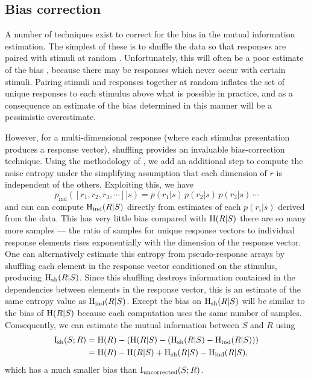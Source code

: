 \subsection{Bias correction}
\label{sec:info-bias}

A number of techniques exist to correct for the bias in the mutual information estimation.
The simplest of these is to shuffle the data so that responses are paired with stimuli at random \citep{Optican1991}.
Unfortunately, this will often be a poor estimate of the bias \citep{Panzeri1996}, because there may be responses which never occur with certain stimuli.
Pairing stimuli and responses together at random inflates the set of unique responses to each stimulus above what is possible in practice, and as a consequence an estimate of the bias determined in this manner will be a pessimistic overestimate.

However, for a multi-dimensional response (where each stimulus presentation produces a response vector), shuffling provides an invaluable bias-correction technique.
Using the methodology of \citet{Montemurro2007}, we add an additional step to compute the noise entropy under the simplifying assumption that each dimension of $r$ is independent of the others.
Exploiting this, we have
\begin{equation}
p_\text{ind}([r_1,r_2,r_3,\cdots]|s) = p(r_1|s) \, p(r_2|s) \, p(r_3|s) \, \cdots
\end{equation}
and can can compute $\operatorname{H}_\text{ind}( R | S )$ directly from estimates of each $p(r_i|s)$ derived from the data.
This has very little bias compared with $\operatorname{H}( R | S )$ there are so many more samples --- the ratio of samples for unique response vectors to individual response elements rises exponentially with the dimension of the response vector.
One can alternatively estimate this entropy from pseudo-response arrays by shuffling each element in the response vector conditioned on the stimulus, producing $\operatorname{H}_\text{sh}( R | S )$.
Since this shuffling destroys information contained in the dependencies between elements in the response vector, this is an estimate of the same entropy value as $\operatorname{H}_\text{ind}( R | S )$.
Except the bias on $\operatorname{H}_\text{sh}( R | S )$ will be similar to the bias of $\operatorname{H}( R | S )$ because each computation uses the same number of samples.
Consequently, we can estimate the mutual information between $S$ and $R$ using
\begin{align}
\operatorname{I}_{\text{sh}}(S;R)
   &= \operatorname{H}( R ) - \left( \operatorname{H}( R | S ) - \left( \operatorname{H}_\text{sh}( R | S ) - \operatorname{H}_\text{ind}( R | S ) \right) \right) \notag
\\ &= \operatorname{H}( R ) - \operatorname{H}( R | S ) + \operatorname{H}_\text{sh}( R | S ) - \operatorname{H}_\text{ind}( R | S )
,\end{align}
which has a much smaller bias than $\operatorname{I}_{\text{uncorrected}}(S;R)$.

